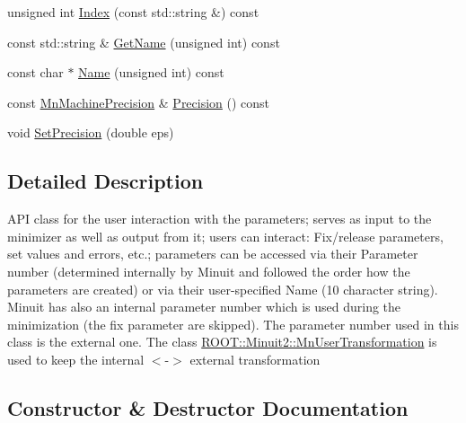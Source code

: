 \begin{DoxyCompactItemize}
\item 
unsigned int \mbox{\hyperlink{classROOT_1_1Minuit2_1_1MnUserParameters_a30523af61ec1c817b0eb060d560f9a95}{Index}} (const std\+::string \&) const
\item 
const std\+::string \& \mbox{\hyperlink{classROOT_1_1Minuit2_1_1MnUserParameters_a6061d066b67d33c98eb6d9ba36b8e269}{Get\+Name}} (unsigned int) const
\item 
const char $\ast$ \mbox{\hyperlink{classROOT_1_1Minuit2_1_1MnUserParameters_a9606a3e37135ef1f08c2fe57036d07eb}{Name}} (unsigned int) const
\item 
const \mbox{\hyperlink{classROOT_1_1Minuit2_1_1MnMachinePrecision}{Mn\+Machine\+Precision}} \& \mbox{\hyperlink{classROOT_1_1Minuit2_1_1MnUserParameters_ac10a27293b367e8b74016e625a90b661}{Precision}} () const
\item 
void \mbox{\hyperlink{classROOT_1_1Minuit2_1_1MnUserParameters_aceaa10ac8b2c83261c3cc026705ee6e0}{Set\+Precision}} (double eps)
\end{DoxyCompactItemize}


\subsection{Detailed Description}
A\+PI class for the user interaction with the parameters; serves as input to the minimizer as well as output from it; users can interact\+: Fix/release parameters, set values and errors, etc.; parameters can be accessed via their Parameter number (determined internally by Minuit and followed the order how the parameters are created) or via their user-\/specified Name (10 character string). Minuit has also an internal parameter number which is used during the minimization (the fix parameter are skipped). The parameter number used in this class is the external one. The class \mbox{\hyperlink{classROOT_1_1Minuit2_1_1MnUserTransformation}{R\+O\+O\+T\+::\+Minuit2\+::\+Mn\+User\+Transformation}} is used to keep the internal $<$-\/$>$ external transformation 

\subsection{Constructor \& Destructor Documentation}
\mbox{\label{classROOT_1_1Minuit2_1_1MnUserParameters_afc09ce197c2e03a228cc9cafc3855371}} 
